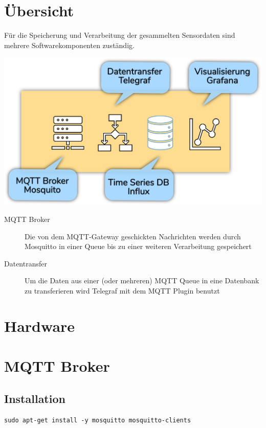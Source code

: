 \documentclass[
  12pt, %
  a4paper, %
  twoside, %
  openany, %
  numbers=noenddot, %
  BCOR=5mm, %
  parskip=half*, %
  thesis, %
]{bfhbook}
\begin{document}
\section{Übersicht}
Für die Speicherung und Verarbeitung der gesammelten Sensordaten sind mehrere Softwarekomponenten zuständig.
\begin{center}
\includegraphics[width=17cm, left]{Bilder/Raspberry-Software.png}%
\label{labelname}%
\end{center}
 \begin{description}
\item[MQTT Broker] Die von dem MQTT-Gateway geschickten Nachrichten werden durch Mosquitto \cite{mosquitto} in einer Queue bis zu einer weiteren Verarbeitung gespeichert
\item[Datentransfer] Um die Daten aus einer (oder mehreren) MQTT Queue in eine Datenbank zu transferieren wird Telegraf \cite{telegraf} mit dem MQTT Plugin benutzt \cite{telegrafmqtt}
\end{description}
\section{Hardware}
\section{MQTT Broker}
\subsection{Installation}
\begin{verbatim}
sudo apt-get install -y mosquitto mosquitto-clients
   \end{verbatim}
\end{document}
